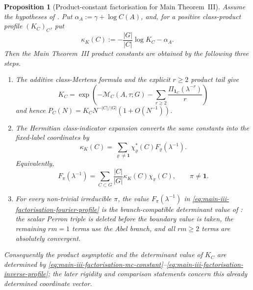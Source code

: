 \documentclass[11pt,a4paper]{amsart}
\theoremstyle{plain}
\newtheorem{proposition}[theorem]{Proposition}
\theoremstyle{definition}
\theoremstyle{remark}
\begin{document}
\begin{proposition}[Product-constant factorisation for Main Theorem~III]
  \label{prop:main-iii-product-constant-factorisation}
  Assume the hypotheses of .  Put
  \(\alpha_A:=\gamma+\log C(A)\), and, for a positive class-product profile
  \((K_C)_C\), put
  \[
    \kappa_K(C):=-\frac{|G|}{|C|}\log K_C-\alpha_A .
  \]
  Then the Main Theorem~III product constants are obtained by the following
  three steps.
  \begin{enumerate}
    \item The additive class-Mertens formula and the explicit \(r\ge2\)
    product tail give
    \begin{equation}\label{eq:main-iii-factorisation-mc-constant}
      K_C=
      \exp\!\left(
        -\mathcal M_C(A,\tau;G)
        -\sum_{r\ge2}\frac{\Pi_{\mathbf1_C}(\lambda^{-r})}{r}
      \right)
    \end{equation}
    and hence
    \(P_C(N)=K_CN^{-|C|/|G|}(1+O(N^{-1}))\).
    \item The Hermitian class-indicator expansion converts the same constants
    into the fixed-label coordinates by
    \begin{equation}\label{eq:main-iii-factorisation-fourier-profile}
      \kappa_K(C)=
      \sum_{\varrho\ne\mathbf1}
        \chi_\varrho^\ast(C)F_\varrho(\lambda^{-1}) .
    \end{equation}
    Equivalently,
    \begin{equation}\label{eq:main-iii-factorisation-inverse-profile}
      F_\pi(\lambda^{-1})=
      \sum_{C\subset G}\frac{|C|}{|G|}\kappa_K(C)\chi_\pi(C),
      \qquad \pi\ne\mathbf1 .
    \end{equation}
    \item For every non-trivial irreducible \(\pi\), the value
    \(F_\pi(\lambda^{-1})\) in \eqref{eq:main-iii-factorisation-fourier-profile} is
    the branch-compatible determinant value of
    : the scalar Perron triple is
    deleted before the boundary value is taken, the remaining \(rm=1\) terms
    use the Abel branch, and all \(rm\ge2\) terms are absolutely convergent.
  \end{enumerate}
  Consequently the product asymptotic and the determinant value of \(K_C\) are
  determined by
  \eqref{eq:main-iii-factorisation-mc-constant}--\eqref{eq:main-iii-factorisation-inverse-profile};
  the later rigidity and comparison statements concern this already determined
  coordinate vector.
\end{proposition}
\end{document}
